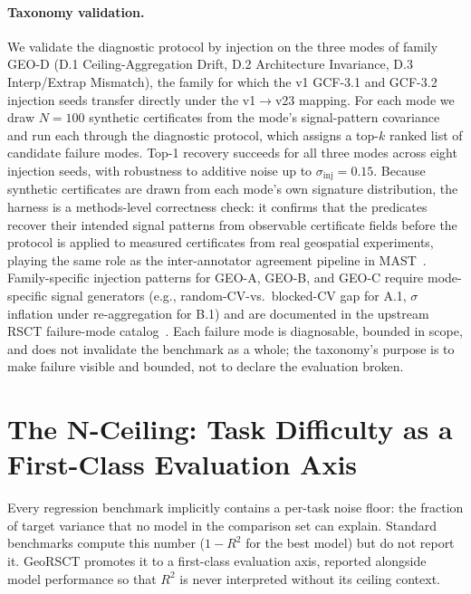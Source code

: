 \documentclass{article}
\begin{document}
\paragraph{Taxonomy validation.}
\label{sec:injection}
We validate the diagnostic protocol by injection on the three modes of family GEO-D (D.1 Ceiling-Aggregation Drift, D.2 Architecture Invariance, D.3 Interp/Extrap Mismatch), the family for which the v1 GCF-3.1 and GCF-3.2 injection seeds transfer directly under the v1$\to$v23 mapping. For each mode we draw $N{=}100$ synthetic certificates from the mode's signal-pattern covariance and run each through the diagnostic protocol, which assigns a top-$k$ ranked list of candidate failure modes. Top-1 recovery succeeds for all three modes across eight injection seeds, with robustness to additive noise up to $\sigma_{\text{inj}}{=}0.15$. Because synthetic certificates are drawn from each mode's own signature distribution, the harness is a methods-level correctness check: it confirms that the predicates recover their intended signal patterns from observable certificate fields before the protocol is applied to measured certificates from real geospatial experiments, playing the same role as the inter-annotator agreement pipeline in MAST~\citep{cemri2025mast}. Family-specific injection patterns for GEO-A, GEO-B, and GEO-C require mode-specific signal generators (e.g., random-CV-vs.\ blocked-CV gap for A.1, $\sigma$ inflation under re-aggregation for B.1) and are documented in the upstream RSCT failure-mode catalog~\citep{martin2026rsct}. Each failure mode is diagnosable, bounded in scope, and does not invalidate the benchmark as a whole; the taxonomy's purpose is to make failure visible and bounded, not to declare the evaluation broken.

\section{The N-Ceiling: Task Difficulty as a First-Class Evaluation Axis}
\label{sec:nceiling}

Every regression benchmark implicitly contains a per-task noise floor: the fraction of target variance that no model in the comparison set can explain. Standard benchmarks compute this number ($1{-}R^2$ for the best model) but do not report it. GeoRSCT promotes it to a first-class evaluation axis, reported alongside model performance so that $R^2$ is never interpreted without its ceiling context.
\end{document}
